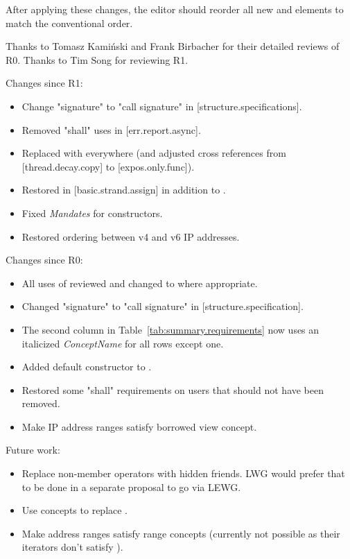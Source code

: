 After applying these changes, the editor should reorder all new
\constraints and \mandates elements to match the conventional order.

\vspace{2.5cm}

Thanks to Tomasz Kamiński and Frank Birbacher for their detailed reviews of R0.
Thanks to Tim Song for reviewing R1.

Changes since R1:
\begin{itemize}
\item Change "signature" to "call signature" in [structure.specifications].
\item Removed "shall" uses in [err.report.async].
\item Replaced  with  everywhere
  (and adjusted cross references from [thread.decay.copy] to [expos.only.func]).
\item Restored \expects in [basic.strand.assign] in addition to \constraints{}.
\item Fixed \textit{Mandates} for  constructors.
\item Restored ordering between v4 and v6 IP addresses.
\end{itemize}

Changes since R0:
\begin{itemize}
\item All uses of  reviewed and changed to
   where appropriate.
\item Changed "signature" to "call signature" in [structure.specification].
\item The second column in Table~\ref{tab:summary.requirements} now uses
  an italicized \textit{ConceptName} for all rows except one.
\item Added  default constructor to .
\item Restored some "shall" requirements on users that should not have been removed.
\item Make IP address ranges satisfy borrowed view concept.
\end{itemize}

Future work:

\begin{itemize}
\item
Replace non-member operators with hidden friends.
LWG would prefer that to be done in a separate proposal to go via LEWG.
\item
Use concepts to replace .
\item
Make address ranges satisfy range concepts (currently not possible as
their iterators don't satisfy ).
\end{itemize}




